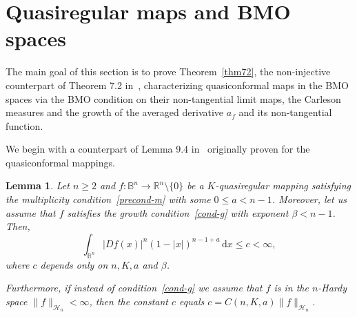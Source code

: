 \documentclass[11pt,a4paper,reqno]{amsart}
\newtheorem{lem}[theorem]{Lemma}
\theoremstyle{definition}
\newcommand{\B}{\mathbb{B}^n}
\newcommand{\Rn}{{\mathbb R}^n}
\newcommand{\ud}{\mathrm {d}}
\newcommand{\blue}{\color{blau}}
\newcounter{komcounter}
\numberwithin{komcounter}{section}
\newcommand{\komT}[1]{{\bf \blue [\refstepcounter{komcounter}\thekomcounter (by T): #1]}}
\begin{document}
\section{Quasiregular maps and BMO spaces} 

The main goal of this section is to prove Theorem~\ref{thm72}, the non-injective counterpart of Theorem 7.2 in~\cite{ak}, characterizing quasiconformal maps in the BMO spaces via the BMO condition on their non-tangential limit maps, the Carleson measures and the growth of the averaged derivative $a_f$ and its non-tangential function. 

We begin with a counterpart of Lemma 9.4 in~\cite{ak} originally proven for the quasiconformal mappings.

\begin{lem}\label{lem94}
 Let $n \geq 2$ and $f:\B\to \Rn \setminus \{0\}$ be a $K$-quasiregular mapping  satisfying the multiplicity condition~\eqref{precond-m} with some $0\leq a<n-1$. Moreover, let us assume that $f$ satisfies the growth condition~\eqref{cond-g} with exponent $\beta<n-1$. Then,
 \[
  \int_{\B}|Df(x)|^{n}(1-|x|)^{n-1+a}\,\ud x\leq c<\infty,
 \]
 where $c$ depends only on $n, K,a$ and $\beta$. 
 
 Furthermore, if instead of condition~\eqref{cond-g} we assume that $f$ is in the $n$-Hardy space $\|f\|_{\mathcal{H}_n}<\infty$, then the constant $c$ equals $c= C(n, K, a)\|f\|_{\mathcal{H}_n}$.
\end{lem}
%
\end{document}
